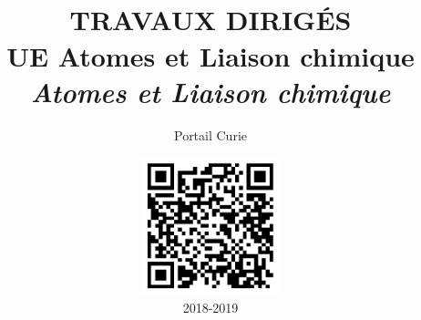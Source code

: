 \documentclass[12pt,a4paper,french,dvips,openright,twoside]{report}
\begin{document}
\title{{\Huge \textbf{      \\ 
TRAVAUX DIRIG\'ES  \\[1.5cm] 
UE Atomes et Liaison chimique\\
\textsl{Atomes et Liaison chimique}}}}
\author{Portail Curie}
\date{\includegraphics[height=4cm]{figure/QRcode_fichier_TD.eps}\\2018-2019}

\pagestyle{empty}
\maketitle

\tableofcontents




%
%
%






\pagestyle{empty}



%
%
\end{document}
